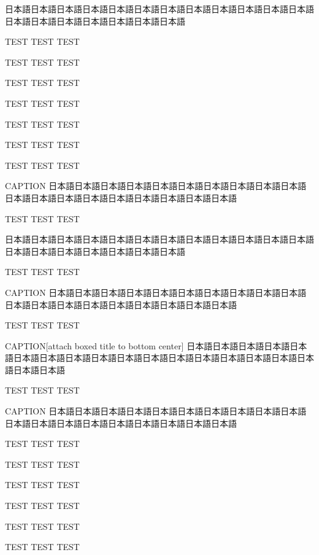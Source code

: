 \begin{rv@outerarcbox@nocaption}
日本語日本語日本語日本語日本語日本語日本語日本語日本語日本語日本語日本語日本語日本語日本語日本語日本語日本語日本語

TEST TEST TEST

TEST TEST TEST

TEST TEST TEST

TEST TEST TEST

TEST TEST TEST

TEST TEST TEST

TEST TEST TEST

\end{rv@outerarcbox@nocaption}

\begin{rv@outerarcbox@caption}{CAPTION}
日本語日本語日本語日本語日本語日本語日本語日本語日本語日本語日本語日本語日本語日本語日本語日本語日本語日本語日本語

TEST TEST TEST

\end{rv@outerarcbox@caption}

\clearpage

\begin{rv@squaresepcaptionbox@nocaption}
日本語日本語日本語日本語日本語日本語日本語日本語日本語日本語日本語日本語日本語日本語日本語日本語日本語日本語日本語

TEST TEST TEST

\end{rv@squaresepcaptionbox@nocaption}

\begin{rv@squaresepcaptionbox@caption}{CAPTION}
日本語日本語日本語日本語日本語日本語日本語日本語日本語日本語日本語日本語日本語日本語日本語日本語日本語日本語日本語

TEST TEST TEST

\end{rv@squaresepcaptionbox@caption}

\begin{rv@squaresepcaptionbox@caption}{CAPTION}[attach boxed title to bottom center]
日本語日本語日本語日本語日本語日本語日本語日本語日本語日本語日本語日本語日本語日本語日本語日本語日本語日本語日本語

TEST TEST TEST

\end{rv@squaresepcaptionbox@caption}

\clearpage

\begin{rv@folderbox@caption}{CAPTION}
日本語日本語日本語日本語日本語日本語日本語日本語日本語日本語日本語日本語日本語日本語日本語日本語日本語日本語日本語

TEST TEST TEST

TEST TEST TEST

TEST TEST TEST

TEST TEST TEST

TEST TEST TEST

TEST TEST TEST

\end{rv@folderbox@caption}

